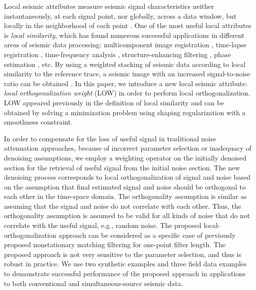 Local seismic attributes measure seismic signal characteristics neither instantaneously, at each signal point, nor globally, across a data window, but locally in the neighborhood of each point \cite[]{fomel2007localattr}. One of the most useful local attributes is \emph{local similarity}, which has found numerous successful applications in different areas of seismic data processing: multicomponent image registration \cite[]{fomel20052,fomel2007localattr}, time-lapse registration \cite[]{fomel20094,zhangrui2013}, time-frequency analysis \cite[]{guochang20113}, structure-enhancing filtering \cite[]{liuyang2010}, phase estimation \cite[]{fomel20142}, etc.
By using a weighted stacking of seismic data according to local similarity to the reference trace, a seismic image with an increased signal-to-noise ratio can be obtained \cite[]{guochang2009,guochang20111}. In this paper, we introduce a new local seismic attribute: \emph{local orthogonalization weight} (LOW) in order to perform local orthogonalization. LOW appeared previously in the definition of local similarity and can be obtained by solving a minimization problem using shaping regularization with a smoothness constraint. 

In order to compensate for the loss of useful signal in traditional noise attenuation approaches, because of incorrect parameter selection or inadequacy of denoising assumptions, we employ a weighting operator on the initially denoised section for the retrieval of useful signal from the initial noise section. The new denoising process corresponds to local orthogonalization of signal and noise based on the assumption that final estimated signal and noise should be orthogonal to each other in the time-space domain. The orthogonality assumption is similar as assuming that the signal and noise do not correlate with each other. Thus, the orthogonality assumption is assumed to be valid for all kinds of noise that do not correlate with the useful signal, e.g., random noise. The proposed local-orthogonalization approach can be considered as a specific case of previously proposed nonstationary matching filtering \cite[]{fomel20095} for one-point filter length. %
The proposed approach is not very sensitive to the parameter selection, and thus is robust in practice. 
We use two synthetic examples and three field data examples to demonstrate successful performance of the proposed approach in applications to both conventional and simultaneous-source seismic data. 
